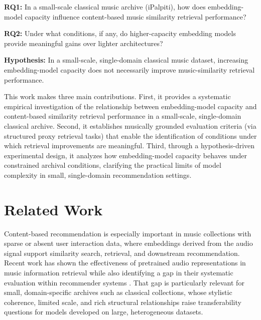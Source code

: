 \documentclass{article}
\begin{document}
\smallskip
\noindent\textbf{RQ1:} In a small-scale classical music archive (iPalpiti), how does embedding-model
capacity influence content-based music similarity retrieval performance?

\noindent\textbf{RQ2:} Under what conditions, if any, do higher-capacity embedding models provide
meaningful gains over lighter architectures?

\noindent\textbf{Hypothesis:} In a small-scale, single-domain classical music dataset, increasing
embedding-model capacity does not necessarily improve music-similarity retrieval performance.

\smallskip
This work makes three main contributions. First, it provides a systematic empirical investigation of
the relationship between embedding-model capacity and content-based similarity retrieval performance
in a small-scale, single-domain classical archive. Second, it establishes musically grounded
evaluation criteria (via structured proxy retrieval tasks) that enable the identification of
conditions under which retrieval improvements are meaningful. Third, through a hypothesis-driven
experimental design, it analyzes how embedding-model capacity behaves under constrained archival
conditions, clarifying the practical limits of model complexity in small, single-domain
recommendation settings.

\section{Related Work}\label{sec:related-work}

Content-based recommendation is especially important in music collections with sparse or absent user
interaction data, where embeddings derived from the audio signal support similarity search,
retrieval, and downstream recommendation. Recent work has shown the effectiveness of pretrained audio
representations in music information retrieval while also identifying a gap in their systematic
evaluation within recommender systems \cite{tamm2024}. That gap is particularly relevant for small,
domain-specific archives such as classical collections, whose stylistic coherence, limited scale, and
rich structural relationships raise transferability questions for models developed on large,
heterogeneous datasets.
\end{document}
